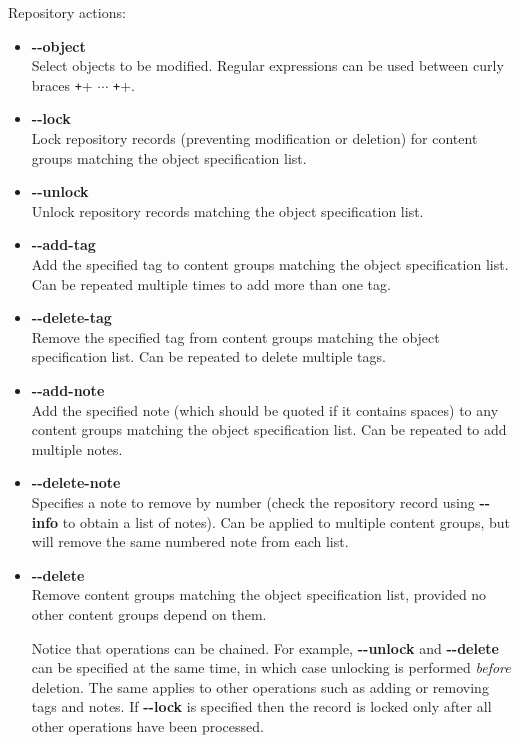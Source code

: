 \documentclass[11pt,a4paper]{article}
\newcommand{\option}[1]{{\ttfamily\bfseries\small #1}}
\begin{document}
\noindent Repository actions:
\begin{itemize}
	\item \option{{-}{-}object} \\
	Select objects to be modified.
	Regular expressions can be used between curly braces
	\texttt+{+
	$\cdots$
	\texttt+}+.
	
	\item \option{{-}{-}lock} \\
	Lock repository records (preventing modification or deletion)
	for content groups matching the object specification list.
	
	\item \option{{-}{-}unlock} \\
	Unlock repository records matching the object specification list.
	
	\item \option{{-}{-}add-tag} \\
	Add the specified tag to content groups matching the object specification
	list. Can be repeated multiple times to add more than one tag.
	
	\item \option{{-}{-}delete-tag} \\
	Remove the specified tag from content groups matching the object specification
	list. Can be repeated to delete multiple tags.
	
	\item \option{{-}{-}add-note} \\
	Add the specified note (which should be quoted if it contains spaces)
	to any content groups
	matching the object specification list. Can be repeated to add multiple notes.
	
	\item \option{{-}{-}delete-note} \\
	Specifies a note to remove by number (check the repository record using
	\option{{-}{-}info} to obtain a list of notes).
	Can be applied to multiple content groups, but will remove the same numbered
	note from each list.
	
	\item \option{{-}{-}delete} \\
	Remove content groups matching the object specification list, provided no
	other content groups depend on them.
	
	Notice that operations can be chained. For example,
	\option{{-}{-}unlock} and
	\option{{-}{-}delete} can be specified
	at the same time, in which case unlocking is performed
	\emph{before} deletion.
	The same applies to other operations such as
	adding or removing tags and notes.
	If \option{{-}{-}lock} is specified then the record is locked
	only after all other operations have been processed.
\end{itemize}
\end{document}
